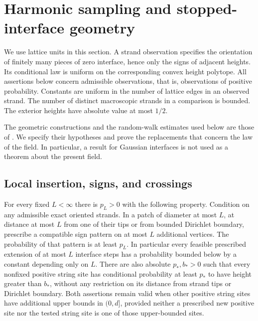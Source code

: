 \section{Harmonic sampling and stopped-interface geometry}
\label{sec:geometry}

We use lattice units in this section. A strand observation specifies the
orientation of finitely many pieces of zero interface, hence only the signs
of adjacent heights. Its conditional law is uniform on the corresponding
convex height polytope. All assertions below concern admissible observations,
that is, observations of positive probability. Constants are uniform in
the number of lattice edges in an observed strand. The number of distinct
macroscopic strands in a comparison is bounded. The exterior heights have
absolute value at most \(1/2\).

The geometric constructions and the random-walk estimates used below are
those of \cite[Sections 2.3 and 3.3--3.7]{SSdiscrete}. We specify their
hypotheses and prove the replacements that concern the law of the field.
In particular, a result for Gaussian interfaces is not used as a theorem
about the present field.

\subsection{Local insertion, signs, and crossings}

\begin{lemma}\label{g:insertion}
For every fixed \(L<\infty\) there is \(p_L>0\) with the following property.
Condition on any admissible exact oriented strands. In a patch of diameter
at most \(L\), at distance at most \(L\) from one of their tips or from
bounded Dirichlet boundary, prescribe a compatible sign pattern on at most
\(L\) additional vertices. The probability of that pattern is at least
\(p_L\). In particular every feasible prescribed extension of at most
\(L\) interface steps has a probability bounded below by a constant
depending only on \(L\). There are also absolute \(p_*,b_*>0\) such that
every nonfixed positive string site has conditional probability at least \(p_*\) to
have height greater than \(b_*\), without any restriction on its distance
from strand tips or Dirichlet boundary. Both assertions remain valid when
other positive string sites have additional upper bounds in \((0,d]\),
provided neither a prescribed new positive site nor the tested string site
is one of those upper-bounded sites.
\end{lemma}

